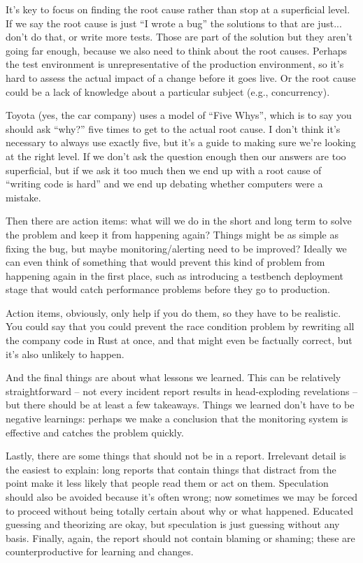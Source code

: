 It's key to focus on finding the root cause rather than stop at a superficial level. If we say the root cause is just ``I wrote a bug'' the solutions to that are just... don't do that, or write more tests. Those are part of the solution but they aren't going far enough, because we also need to think about the root causes. Perhaps the test environment is unrepresentative of the production environment, so it's hard to assess the actual impact of a change before it goes live. Or the root cause could be a lack of knowledge about a particular subject (e.g., concurrency). 

Toyota (yes, the car company) uses a model of ``Five Whys'', which is to say you should ask ``why?'' five times to get to the actual root cause. I don't think it's necessary to always use exactly five, but it's a guide to making sure we're looking at the right level. If we don't ask the question enough then our answers are too superficial, but if we ask it too much then we end up with a root cause of ``writing code is hard'' and we end up debating whether computers were a mistake.

Then there are action items: what will we do in the short and long term to solve the problem and keep it from happening again? Things might be as simple as fixing the bug, but maybe monitoring/alerting need to be improved? Ideally we can even think of something that would prevent this kind of problem from happening again in the first place, such as introducing a testbench deployment stage that would catch performance problems before they go to production. 

Action items, obviously, only help if you do them, so they have to be realistic. You could say that you could prevent the race condition problem by rewriting all the company code in Rust at once, and that might even be factually correct, but it's also unlikely to happen.

And the final things are about what lessons we learned. This can be relatively straightforward -- not every incident report results in head-exploding revelations -- but there should be at least a few takeaways. Things we learned don't have to be negative learnings: perhaps we make a conclusion that the monitoring system is effective and catches the problem quickly. 

Lastly, there are some things that should not be in a report. Irrelevant detail is the easiest to explain: long reports that contain things that distract from the point make it less likely that people read them or act on them. Speculation should also be avoided because it's often wrong; now sometimes we may be forced to proceed without being totally certain about why or what happened. Educated guessing and theorizing are okay, but speculation is just guessing without any basis. Finally, again, the report should not contain blaming or shaming; these are counterproductive for learning and changes. 

